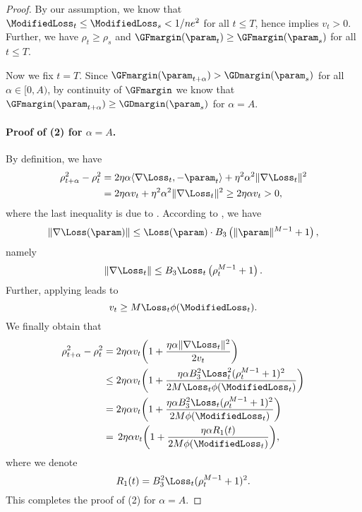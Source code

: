 \begin{proof}
    By our assumption, we know that $\ModifiedLoss_t \le \ModifiedLoss_s < 1/ne^2$ for all $t \le T$, hence  implies $v_t > 0$. Further, we have $\rho_t \ge \rho_s$ and $\GFmargin (\param_t) \ge \GFmargin (\param_s)$ for all $t \le T$.

    Now we fix $t = T$. Since $\GFmargin (\param_{t+\alpha}) > \GDmargin (\param_{s})$ for all $\alpha \in [0, A)$, by continuity of $\GFmargin$ we know that $\GFmargin (\param_{t+\alpha}) \ge \GDmargin (\param_{s})$ for $\alpha = A$.

    \paragraph{Proof of (2) for $\alpha = A$.} By definition, we have 
    \begin{align*}
        \rho_{t + \alpha}^2 - \rho_t^2 &= 2 \eta \alpha \langle \nabla \Loss_t, - \param_t \rangle  + \eta^2 \alpha^2 \|\nabla \Loss_t\|^2 \\
        & = 2 \eta \alpha v_t + \eta^2 \alpha^2 \|\nabla \Loss_t\|^2 \ge 2 \eta \alpha v_t > 0,
    \end{align*}
    where the last inequality is due to . According to , we have
    \begin{align*}
        \| \nabla \Loss (\param) \| \le \Loss (\param) \cdot B_3 \left( \| \param \|^{M - 1} + 1 \right),
    \end{align*}
    namely
    \begin{equation*}
        \| \nabla \Loss_t \| \le B_3 \Loss_t \left( \rho_t^{M-1} + 1 \right).
    \end{equation*}
    Further, applying  leads to
    \begin{equation*}
        v_t \ge M \Loss_t \phi(\ModifiedLoss_t).
    \end{equation*}
    We finally obtain that
    \begin{align*}
        \rho_{t+\alpha}^2 - \rho_t^2 
        & = 2 \eta \alpha v_t \bigg( 1+ \frac{\eta \alpha \|\nabla \Loss_t\|^2}{2 v_t} \bigg) \\ 
        & \le 2 \eta \alpha v_t \bigg ( 1+ \frac{\eta \alpha B_3^2 \Loss_t^2 (\rho_t^{M - 1} + 1)^2 }{2M \Loss_t \phi(\ModifiedLoss_t)} \bigg) \\ 
        & = 2 \eta \alpha v_t \bigg ( 1+ \frac{\eta \alpha B_3^2 \Loss_t (\rho_t^{M - 1} + 1)^2 }{2M \phi(\ModifiedLoss_t)} \bigg) \\
        & = \, 2 \eta \alpha v_t \bigg ( 1+ \frac{\eta \alpha R_1 (t) }{2M \phi(\ModifiedLoss_t)} \bigg),
    \end{align*}
    where we denote
    \begin{equation*}
        R_1 (t) = B_3^2 \Loss_t (\rho_t^{M - 1} + 1)^2.
    \end{equation*}
    This completes the proof of (2) for $\alpha = A$.


\end{proof}
